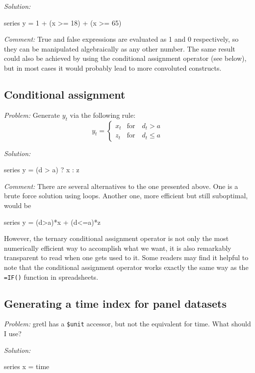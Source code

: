 \emph{Solution:}
\begin{code}
series y = 1 + (x >= 18) + (x >= 65)
\end{code}

\emph{Comment:} True and false expressions are evaluated as 1 and 0
respectively, so they can be manipulated algebraically as any other
number. The same result could also be achieved by using the
conditional assignment operator (see below), but in most cases it
would probably lead to more convoluted constructs.

\subsection{Conditional assignment}

\emph{Problem:} Generate $y_t$ via the following rule:
\[
  y_t = \left\{ 
    \begin{array}{ll} 
      x_t & \mathrm{for} \quad d_t > a \\ 
      z_t & \mathrm{for} \quad d_t \le a 
    \end{array}
    \right. 
\]

\emph{Solution:}
\begin{code}
series y = (d > a) ? x : z
\end{code}

\emph{Comment:} There are several alternatives to the one presented
above. One is a brute force solution using loops. Another one, more
efficient but still suboptimal, would be 
\begin{code}
series y = (d>a)*x + (d<=a)*z  
\end{code}
However, the ternary conditional assignment operator is not only the
most numerically efficient way to accomplish what we want, it is also
remarkably transparent to read when one gets used to it. Some readers
may find it helpful to note that the conditional assignment operator
works exactly the same way as the \texttt{=IF()} function in
spreadsheets.

\subsection{Generating a time index for panel datasets}

\emph{Problem:} gretl has a \texttt{\$unit} accessor, but not
the equivalent for time. What should I use?

\emph{Solution:}
\begin{code}
series x = time
\end{code}

